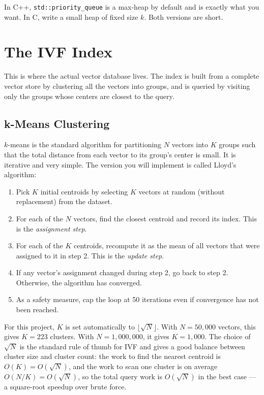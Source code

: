 \documentclass[11pt,a4paper]{article}
\begin{document}
In C++, \texttt{std::priority\_queue} is a max-heap by default and is exactly what you want. In C, write a small heap of fixed size $k$. Both versions are short.

\section{The IVF Index}

This is where the actual vector database lives. The index is built from a complete vector store by clustering all the vectors into groups, and is queried by visiting only the groups whose centers are closest to the query.

\subsection{k-Means Clustering}
$k$-means is the standard algorithm for partitioning $N$ vectors into $K$ groups such that the total distance from each vector to its group's center is small. It is iterative and very simple. The version you will implement is called Lloyd's algorithm:

\begin{enumerate}
\item Pick $K$ initial centroids by selecting $K$ vectors at random (without replacement) from the dataset.
\item For each of the $N$ vectors, find the closest centroid and record its index. This is the \textit{assignment step}.
\item For each of the $K$ centroids, recompute it as the mean of all vectors that were assigned to it in step 2. This is the \textit{update step}.
\item If any vector's assignment changed during step 2, go back to step 2. Otherwise, the algorithm has converged.
\item As a safety measure, cap the loop at 50 iterations even if convergence has not been reached.
\end{enumerate}

For this project, $K$ is set automatically to $\lfloor\sqrt{N}\rfloor$. With $N = 50{,}000$ vectors, this gives $K = 223$ clusters. With $N = 1{,}000{,}000$, it gives $K = 1{,}000$. The choice of $\sqrt{N}$ is the standard rule of thumb for IVF and gives a good balance between cluster size and cluster count: the work to find the nearest centroid is $O(K) = O(\sqrt N)$, and the work to scan one cluster is on average $O(N/K) = O(\sqrt N)$, so the total query work is $O(\sqrt N)$ in the best case --- a square-root speedup over brute force.
\end{document}
